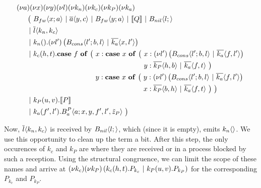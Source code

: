 \begin{align*}
  &\anew{a}{\anew{x}{\anew{y}{\anew{l}{\anew{k_n}{\anew{k_c}{\anew{k_P}{\anew{k_a}{ \\
    &\hspace{0.5cm}
    \begin{aligned}[t]
      \big(\ &\ains{B_{fw}}{x}{a}
      \apar   \asnd{a}{y,c}
      \apar   \ains{B_{fw}}{y}{a}
      \apar   \encMJtoAP{Q}
      \apar   \ains{B_{nil}}{l}{}
      \\
      \apar  &\asnd{l}{k_n,k_c}
      \\
      \apar  &\arcv{k_n}{} . \anew{l'}{\parens{\ains{B_{cons}}{l'}{b, l} \apar \asnd{k_a}{x, l'}}}
      \\
      \apar  &\arcv{k_c}{h,t} .
        \begin{aligned}[t]
          \acse*{f}{\big(\ 
            &\aalt{x}{
              \begin{aligned}[t]
                \acse*{x}{\big(\ 
                  &\aalt{x}{\anew*{l'}{
                    \ains{B_{cons}}{l'}{b,l} \apar \asnd{k_a}{f,l'}
                  }}\\
                  &\aalt{y}{
                    \asnd{k_P}{h,b} \apar \asnd{k_a}{f,t}
                  }\ 
                \big)}
              \end{aligned}
            }\\
            &\aalt{y}{
              \begin{aligned}[t]
                \acse*{x}{\big(\ 
                  &\aalt{y}{\anew*{l'}{
                    \ains{B_{cons}}{l'}{b,l} \apar \asnd{k_a}{f,l'}
                  }}\\
                  &\aalt{x}{
                    \asnd{k_P}{b,h} \apar \asnd{k_a}{f,t}
                  }\ 
                \big)}
                \ \big)
              \end{aligned}
            }\ 
          }
        \end{aligned}
      \\
      \apar  &\arcv{k_P}{u,v} . \encMJtoAP{P}
      \\
      \apar  &\arcv{k_a}{f',l'} . \ains{B_a^P}{a}{x, y, f', l',\tilde{z}_P}
      \ \big)
    \end{aligned}
  }}}}}}}}
\end{align*}

Now, $\overline{l}\langle k_n,k_c\rangle$ is received by $B_{nil} \langle l ;  \rangle$,
which (since it is empty), emits $k_n\langle\rangle$.
We use this opportunity to clean up the term a bit.
After this step, the only occurences of $k_c$ and $k_P$ are where they are
received or in a process blocked by such a reception. Using the
structural congruence, we can limit the scope of these names and arrive at
$\anew{k_c}{\anew*{k_P}{\arcv{k_c}{h,t} . P_{k_c} \apar \arcv{k_P}{u,v} . P_{k_P}}}$
for the corresponding $P_{k_c}$ and $P_{k_P}$.


